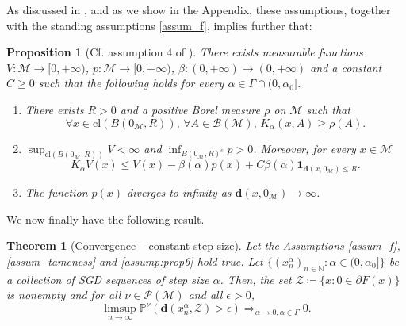 \documentclass{article}
\newtheorem{proposition}{Proposition}
\newtheorem{theorem}{Theorem}
\newcommand{\CM}{\mathcal{M}}
\newcommand{\BN}{\mathbb{N}}
\newcommand{\bd}{\mathbf{d}}
\begin{document}
As discussed in \cite{bianchi2022convergence}, and as we show in the Appendix, these assumptions, together with the standing assumptions \ref{assum_f}, implies further that:
\begin{proposition}[Cf. assumption 4 of \cite{bianchi2022convergence}]\label{prop:Assumption4}
    There exists measurable functions $V:\CM\to [0,+\infty)$, $p:\CM\to[0,+\infty)$, $\beta:(0,+\infty)\to (0,+\infty)$ and a constant $C\geq 0$ such that the following holds for every $\alpha\in\Gamma\cap(0,\alpha_0]$.
    \begin{enumerate}
        \item There exists $R>0$ and a positive Borel measure $\rho$ on $\CM$ such that 
        \begin{equation}
            \forall x\in \text{cl}(B(0_\CM,R)),\, \forall A\in\mathcal{B}(\CM),\,K_\alpha(x,A)\geq\rho(A). 
        \end{equation}

        \item $\sup_{\text{cl}(B(0_\CM,R))}V<\infty$ and $\inf_{B(0_\CM,R)^c}p>0$. Moreover, for every $x\in\CM$
        \begin{equation}
            K_\alpha V(x)\leq V(x)-\beta(\alpha)p(x)+C\beta(\alpha)\textbf{1}_{\bd(x,0_\CM)\leq R}.
        \end{equation}

        \item The function $p(x)$ diverges to infinity as $\bd(x,0_\CM)\to\infty$.
    \end{enumerate}
\end{proposition}

We now finally have the following result.

\begin{theorem}[Convergence -- constant step size]\label{th:convCSS}
    Let the Assumptions \ref{assum_f}, \ref{assum_tameness} and \ref{assump:prop6} hold true. Let $\{(x_n^\alpha)_{n\in\BN}:\alpha\in(0,\alpha_0]\}$ be a collection of SGD sequences of step size $\alpha$. Then, the set $\mathcal{Z}\coloneqq \{x:0\in\partial F(x)\}$ is nonempty and for all $\nu\in\mathcal{P}(\CM)$ and all $\epsilon>0$,
    \begin{equation}
        \limsup_{n\to\infty}\mathbb{P}^\nu\left(\textbf{d}(x_n^\alpha,\mathcal{Z})>\epsilon\right)\Longrightarrow_{\alpha\to0,\alpha\in\Gamma}0.
    \end{equation}
\end{theorem}
\end{document}
